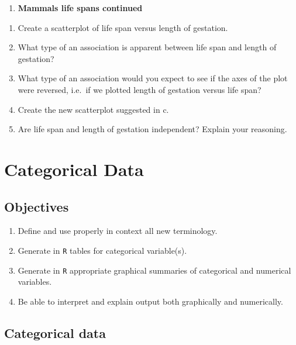 \documentclass[
]{book}
\providecommand{\tightlist}{%
  \setlength{\itemsep}{0pt}\setlength{\parskip}{0pt}}
\begin{document}
\begin{enumerate}
\def\labelenumi{\arabic{enumi}.}
\setcounter{enumi}{2}
\tightlist
\item
  \textbf{Mammals life spans continued}
\end{enumerate}

\begin{enumerate}
\def\labelenumi{\alph{enumi}.}
\tightlist
\item
  Create a scatterplot of life span versus length of gestation.\\
\item
  What type of an association is apparent between life span and length of gestation?\\
\item
  What type of an association would you expect to see if the axes of the plot were reversed, i.e.~if we plotted length of gestation versus life span?
\item
  Create the new scatterplot suggested in c.\\
\item
  Are life span and length of gestation independent? Explain your reasoning.
\end{enumerate}

\hypertarget{CATDATA}{%
\chapter{Categorical Data}\label{CATDATA}}

\hypertarget{objectives-5}{%
\section{Objectives}\label{objectives-5}}

\begin{enumerate}
\def\labelenumi{\arabic{enumi})}
\tightlist
\item
  Define and use properly in context all new terminology.
\item
  Generate in \texttt{R} tables for categorical variable(s).\\
\item
  Generate in \texttt{R} appropriate graphical summaries of categorical and numerical variables.\\
\item
  Be able to interpret and explain output both graphically and numerically.
\end{enumerate}

\hypertarget{categorical-data}{%
\section{Categorical data}\label{categorical-data}}
\end{document}

